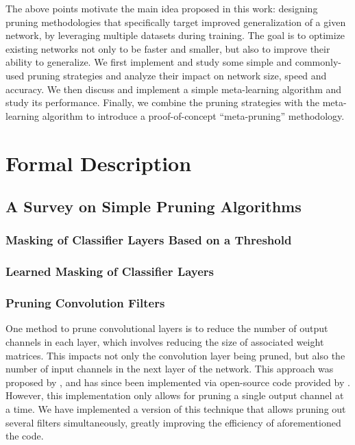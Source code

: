 \documentclass{article}
\begin{document}
The above points motivate the main idea proposed in this work: designing pruning methodologies that specifically target improved generalization of a given network, by leveraging multiple datasets during training. The goal is to optimize existing networks not only to be faster and smaller, but also to improve their ability to generalize. We first implement and study some simple and commonly-used pruning strategies and analyze their impact on network size, speed and accuracy. We then discuss and implement a simple meta-learning algorithm and study its performance. Finally, we combine the pruning strategies with the meta-learning algorithm to introduce a proof-of-concept ``meta-pruning'' methodology.

\section{Formal Description}

\subsection{A Survey on Simple Pruning Algorithms}

\subsubsection{Masking of Classifier Layers Based on a Threshold} \label{maskClass}

\subsubsection{Learned Masking of Classifier Layers} \label{maskClassL0}

\subsubsection{Pruning Convolution Filters} \label{PruneFilter}

One method to prune convolutional layers is to reduce the number of output channels in each layer, which involves reducing the size of associated weight matrices. This impacts not only the convolution layer being pruned, but also the number of input channels in the next layer of the network. This approach was proposed by \cite{prune_transfer_learning}, and has since been implemented via open-source code provided by \cite{jacobgilblog}. However, this implementation only allows for pruning a single output channel at a time. We have implemented a version of this technique that allows pruning out several filters simultaneously, greatly improving the efficiency of aforementioned the code.
\end{document}
